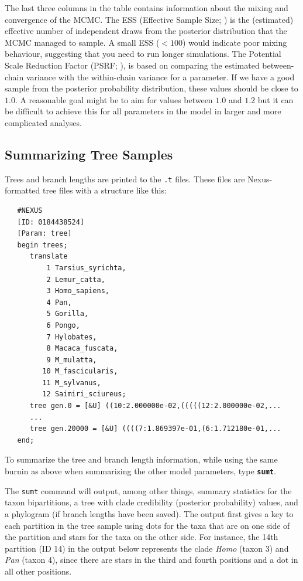 \documentclass[12pt]{book}
\newcommand{\ttt}[1]{\texttt{#1}}
\newcommand{\tb}[1]{\ttt{\textbf{#1}}}
\begin{document}
The last three columns in the table contains information about the mixing and convergence of the
MCMC. The ESS (Effective Sample Size; \citet{ripley87}) is the (estimated) effective number of
independent draws from the posterior distribution that the MCMC managed to sample. A small ESS
($<100$) would indicate poor mixing behaviour, suggesting that you need to run longer simulations.
The Potential Scale Reduction Factor (PSRF; \citet{gelman92}), is based on comparing the estimated
between-chain variance with the within-chain variance for a parameter. If we have a good sample
from the posterior probability distribution, these values should be close to $1.0$. A reasonable
goal might be to aim for values between $1.0$ and $1.2$ but it can be difficult to achieve this
for all parameters in the model in larger and more complicated analyses.

\subsection{Summarizing Tree Samples}

Trees and branch lengths are printed to the \ttt{.t} files. These files are Nexus-formatted tree
files with a structure like this:

\begin{singlespacing}
\footnotesize
\begin{verbatim}
   #NEXUS
   [ID: 0184438524]
   [Param: tree]
   begin trees;
      translate
          1 Tarsius_syrichta,
          2 Lemur_catta,
          3 Homo_sapiens,
          4 Pan,
          5 Gorilla,
          6 Pongo,
          7 Hylobates,
          8 Macaca_fuscata,
          9 M_mulatta,
         10 M_fascicularis,
         11 M_sylvanus,
         12 Saimiri_sciureus;
      tree gen.0 = [&U] ((10:2.000000e-02,(((((12:2.000000e-02,...
      ...
      tree gen.20000 = [&U] ((((7:1.869397e-01,(6:1.712180e-01,...
   end;
\end{verbatim}
\normalsize
\end{singlespacing}

To summarize the tree and branch length information, while using the same burnin as above when
summarizing the other model parameters, type \tb{sumt}.

The \ttt{sumt} command will output, among other things, summary statistics for the taxon
bipartitions, a tree with clade credibility (posterior probability) values, and a phylogram (if
branch lengths have been saved). The output first gives a key to each partition in the tree sample
using dots for the taxa that are on one side of the partition and stars for the taxa on the other
side. For instance, the 14th partition (ID 14) in the output below represents the clade
\textit{Homo} (taxon 3) and \textit{Pan} (taxon 4), since there are stars in the third and fourth
positions and a dot in all other positions.
\end{document}
